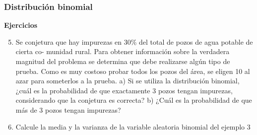 \documentclass[spanish]{beamer}
\begin{document}
\begin{frame}
\frametitle{Distribución binomial}
\textbf{Ejercicios}

  \begin{enumerate}
  \setcounter{enumi}{4}
\item Se conjetura que hay impurezas en 30\% del total de pozos de agua potable de cierta co-
munidad rural. Para obtener información sobre la verdadera magnitud del problema se
determina que debe realizarse algún tipo de prueba. Como es muy costoso probar todos
los pozos del área, se eligen 10 al azar para someterlos a la prueba.
    a) Si se utiliza la distribución binomial, ¿cuál es la probabilidad de que exactamente 3
pozos tengan impurezas, considerando que la conjetura es correcta?
    b) ¿Cuál es la probabilidad de que más de 3 pozos tengan impurezas?
    
\item Calcule la media y la varianza de la variable aleatoria binomial del ejemplo 3
    

    
\end{enumerate}      
    
\end{frame}
\end{document}
